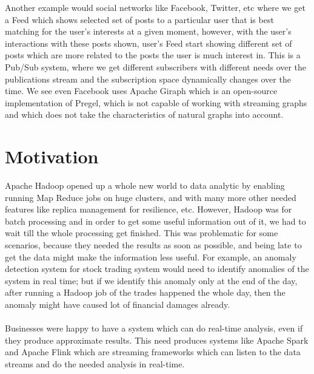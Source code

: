 \documentclass[12pt]{report}
\numberwithin{figure}{section}
\numberwithin{table}{section}
\begin{document}
Another example would social networks like Facebook, Twitter, etc where we get a Feed which shows selected set of posts to a particular user that is best matching for the user’s interests at a given moment, however, with the user’s interactions with these posts shown, user’s Feed start showing different set of posts which are more related to the posts the user is much interest in. This is a Pub/Sub system, where we get different subscribers with different needs over the publications stream and the subscription space dynamically changes over the time. We see even Facebook uses\cite{Facebook} Apache Giraph which is an open-source implementation of Pregel\cite{Pregel}, which is not capable of working with streaming graphs and which does not take the characteristics of natural graphs into account. 

\section{Motivation}

Apache Hadoop opened up a whole new world to data analytic by enabling running Map Reduce jobs on huge clusters, and with many more other needed features like replica management for resilience, etc. However, Hadoop was for batch processing and in order to get some useful information out of it, we had to wait till the whole processing get finished. This was problematic for some scenarios, because they needed the results as soon as possible, and being late to get the data might make the information less useful. For example, an anomaly detection system for stock trading system would need to identify anomalies of the system in real time; but if we identify this anomaly only at the end of the day, after running a Hadoop job of the trades happened the whole day, then the anomaly might have caused lot of financial damages already. 

\paragraph{}

Businesses were happy to have a system which can do real-time analysis, even if they produce approximate results. This need produces systems like Apache Spark and Apache Flink which are streaming frameworks which can listen to the data streams and do the needed  analysis in real-time. 

\paragraph{}
\end{document}
